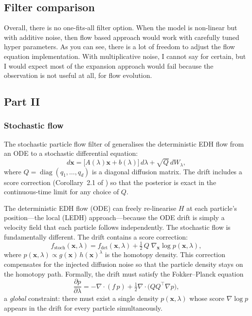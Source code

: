 \documentclass{article}
\renewcommand{\v}[1]{ \ensuremath{ {\mathbf{#1}} }}
\begin{document}
\subsection{Filter comparison}
Overall, there is no one-fits-all filter option. When the model is non-linear but with additive noise, then flow based approach would work with carefully tuned hyper parameters. As you can see, there is a lot of freedom to adjust the flow equation implementation. With multiplicative noise, I cannot say for certain, but I would expect most of the expansion approach would fail because the observation is not useful at all, for flow evolution. 


\newpage
\subsection{Part II}
\subsubsection{Stochastic flow}

The stochastic particle flow filter of \cite{dai-new-2021} generalises the deterministic EDH flow from an ODE to a stochastic differential equation:
\[
  d\v{x} = \bigl[A(\lambda)\v{x} + b(\lambda)\bigr]\,d\lambda + \sqrt{Q}\,dW_\lambda,
\]
where $Q = \operatorname{diag}(q_1,\ldots,q_d)$ is a diagonal diffusion matrix. The drift includes a score correction (Corollary~2.1 of \cite{dai-new-2021}) so that the posterior is exact in the continuous-time limit for any choice of $Q$.

The deterministic EDH flow (ODE) can freely re-linearise $H$ at each particle's position---the local (LEDH) approach---because the ODE drift is simply a velocity field that each particle follows independently. The stochastic flow is fundamentally different. The drift contains a score correction:
\[
  f_{\mathrm{stoch}}(\v{x},\lambda)
  = f_{\mathrm{det}}(\v{x},\lambda)
    + \tfrac{1}{2}\,Q\;\nabla_{\v{x}} \log p(\v{x},\lambda),
\]
where $p(\v{x},\lambda) \propto g(\v{x})\,h(\v{x})^{\lambda}$ is the homotopy density. This correction compensates for the injected diffusion noise so that the particle density stays on the homotopy path. Formally, the drift must satisfy the Fokker--Planck equation
\[
  \frac{\partial p}{\partial\lambda}
  = -\nabla\!\cdot\!(f\,p) + \tfrac{1}{2}\nabla\!\cdot\!\bigl(QQ^\top \nabla p\bigr),
\]
a \emph{global} constraint: there must exist a single density $p(\v{x},\lambda)$ whose score $\nabla\log p$ appears in the drift for every particle simultaneously.
\end{document}
